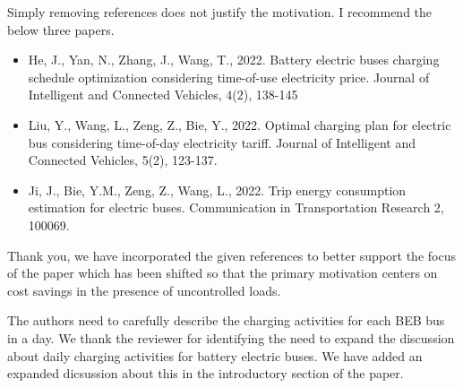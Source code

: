 \documentclass{article}
\begin{document}
\begin{buttkissing}
	\reviewerclaims Simply removing references does not justify the motivation. I recommend the below three papers.
		\begin{itemize}
			\item He, J., Yan, N., Zhang, J., Wang, T., 2022. Battery electric buses charging schedule optimization considering time-of-use electricity price. Journal of Intelligent and Connected Vehicles, 4(2), 138-145
			\item Liu, Y., Wang, L., Zeng, Z., Bie, Y., 2022. Optimal charging plan for electric bus considering time-of-day electricity tariff. Journal of Intelligent and Connected Vehicles, 5(2), 123-137.
			\item Ji, J., Bie, Y.M., Zeng, Z., Wang, L., 2022. Trip energy consumption estimation for electric buses. Communication in Transportation Research 2, 100069.
		\end{itemize} 
	\kissbutt Thank you, we have incorporated the given references to better support the focus of the paper which has been shifted so that the primary motivation centers on cost savings in the presence of uncontrolled loads.
	
	\reviewerclaims The authors need to carefully describe the charging activities for each BEB bus in a day.
	\kissbutt We thank the reviewer for identifying the need to expand the discussion about daily charging activities for battery electric buses.  We have added an expanded dicsussion about this in the introductory section of the paper.
  \end{buttkissing}
\end{document}
